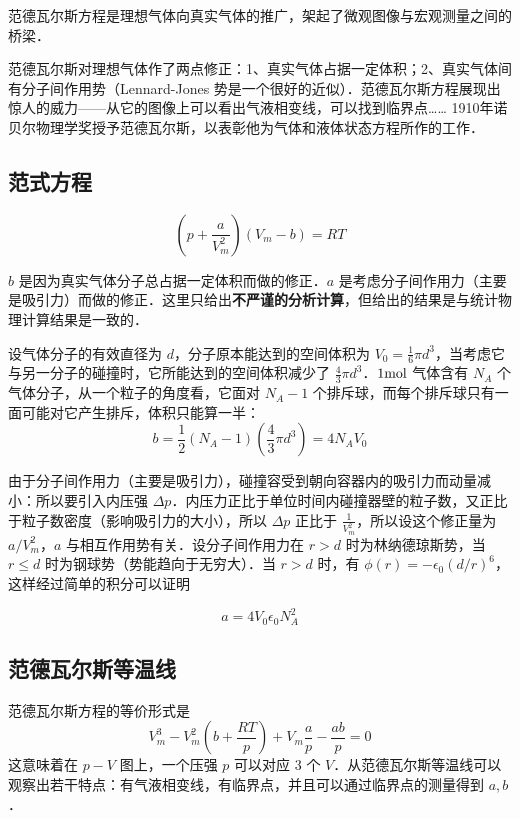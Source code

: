 
范德瓦尔斯方程是理想气体向真实气体的推广，架起了微观图像与宏观测量之间的桥梁．

范德瓦尔斯对理想气体作了两点修正：1、真实气体占据一定体积；2、真实气体间有分子间作用势（Lennard-Jones 势是一个很好的近似）．范德瓦尔斯方程展现出惊人的威力——从它的图像上可以看出气液相变线，可以找到临界点…… 1910年诺贝尔物理学奖授予范德瓦尔斯，以表彰他为气体和液体状态方程所作的工作．

\subsection{范式方程}

\begin{equation}
\left(p+\frac{a}{V_m^2}\right)(V_m-b)=RT
\end{equation}

$b$ 是因为真实气体分子总占据一定体积而做的修正．$a$ 是考虑分子间作用力（主要是吸引力）而做的修正．这里只给出\textbf{不严谨的分析计算}，但给出的结果是与统计物理计算结果是一致的．

设气体分子的有效直径为 $d$，分子原本能达到的空间体积为 $V_0=\frac{1}{6}\pi d^3$，当考虑它与另一分子的碰撞时，它所能达到的空间体积减少了 $\frac{4}{3}\pi d^3$．$1\rm mol$ 气体含有 $N_A$ 个气体分子，从一个粒子的角度看，它面对 $N_A-1$ 个排斥球，而每个排斥球只有一面可能对它产生排斥，体积只能算一半：
\begin{equation}
b=\frac{1}{2}(N_A-1)(\frac{4}{3}\pi d^3)=4N_A V_0
\end{equation}

由于分子间作用力（主要是吸引力），碰撞容受到朝向容器内的吸引力而动量减小：所以要引入内压强 $\Delta p$．内压力正比于单位时间内碰撞器壁的粒子数，又正比于粒子数密度（影响吸引力的大小），所以 $\Delta p$ 正比于 $\frac{1}{V_m^2}$，所以设这个修正量为 $a/V_m^2$，$a$ 与相互作用势有关．设分子间作用力在 $r>d$ 时为林纳德琼斯势，当 $r\le d$ 时为钢球势（势能趋向于无穷大）．当 $r>d$ 时，有 $\phi(r)=-\epsilon_0(d/r)^6$，这样经过简单的积分可以证明

\begin{equation}
a=4V_0\epsilon_0 N_A^2
\end{equation}

\subsection{范德瓦尔斯等温线}
范德瓦尔斯方程的等价形式是
\begin{equation}
V_m^3-V_m^2(b+\frac{RT}{p})+V_m\frac{a}{p}-\frac{ab}{p}=0
\end{equation}
这意味着在 $p-V$ 图上，一个压强 $p$ 可以对应 $3$ 个 $V$．从范德瓦尔斯等温线可以观察出若干特点：有气液相变线，有临界点，并且可以通过临界点的测量得到 $a,b$．